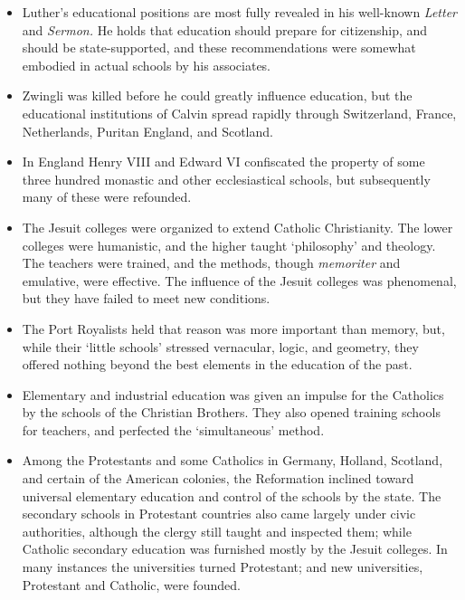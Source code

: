 \documentclass[]{book}
\providecommand{\tightlist}{%
  \setlength{\itemsep}{0pt}\setlength{\parskip}{0pt}}
\begin{document}
\begin{itemize}
\tightlist
\item
  Luther's educational positions are most fully revealed in his well-known \emph{Letter} and \emph{Sermon.} He holds that education should prepare for citizenship, and should be state-supported, and these recommendations were somewhat embodied in actual schools by his associates.
\item
  Zwingli was killed before he could greatly influence education, but the educational institutions of Calvin spread rapidly through Switzerland, France, Netherlands, Puritan England, and Scotland.
\item
  In England Henry VIII and Edward VI confiscated the property of some three hundred monastic and other ecclesiastical schools, but subsequently many of these were refounded.
\item
  The Jesuit colleges were organized to extend Catholic Christianity. The lower colleges were humanistic, and the higher taught `philosophy' and theology. The teachers were trained, and the methods, though \emph{memoriter} and emulative, were effective. The influence of the Jesuit colleges was phenomenal, but they have failed to meet new conditions.
\item
  The Port Royalists held that reason was more important than memory, but, while their `little schools' stressed vernacular, logic, and geometry, they offered nothing beyond the best elements in the education of the past.
\item
  Elementary and industrial education was given an impulse for the Catholics by the schools of the Christian Brothers. They also opened training schools for teachers, and perfected the `simultaneous' method.
\item
  Among the Protestants and some Catholics in Germany, Holland, Scotland, and certain of the American colonies, the Reformation inclined toward universal elementary education and control of the schools by the state. The secondary schools in Protestant countries also came largely under civic authorities, although the clergy still taught and inspected them; while Catholic secondary education was furnished mostly by the Jesuit colleges. In many instances the universities turned Protestant; and new universities, Protestant and Catholic, were founded.
\end{itemize}
\end{document}
